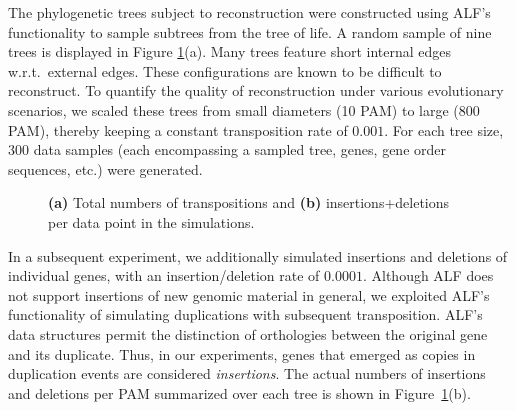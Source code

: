 \documentclass[9pt,english,utf8]{article}
\begin{document}
\medskip
The phylogenetic trees subject to reconstruction were constructed using ALF's
functionality to sample subtrees from the tree of life. A random sample of nine
trees is displayed in Figure \ref{fig:mutations}(a). Many trees feature short
internal edges w.r.t.~external edges.  These configurations are known to be
difficult to reconstruct. To quantify the quality of reconstruction under
various evolutionary scenarios, we scaled these trees from small diameters (10
PAM) to large (800 PAM), thereby keeping a constant transposition rate of
$0.001$. For each tree size, 300 data samples (each encompassing a sampled
tree, genes, gene order sequences, etc.) were generated. 

\begin{figure}[tbh]
    \caption{\textbf{(a)} Total numbers of transpositions and \textbf{(b)}
    insertions+deletions per data point in the simulations.}
    \label{fig:mutations}
\end{figure}

In a subsequent experiment, we additionally simulated insertions and deletions
of individual genes, with an insertion/deletion rate of $0.0001$. Although ALF
does not support insertions of new genomic material in general, we exploited
ALF's functionality of simulating duplications with subsequent transposition.
ALF's data structures permit the distinction of orthologies between the
original gene and its duplicate. Thus, in our experiments, genes that emerged
as copies in duplication events are considered \emph{insertions}. The actual
numbers of insertions and deletions per PAM summarized over each tree is shown
in Figure~\ref{fig:mutations}(b).
\end{document}
